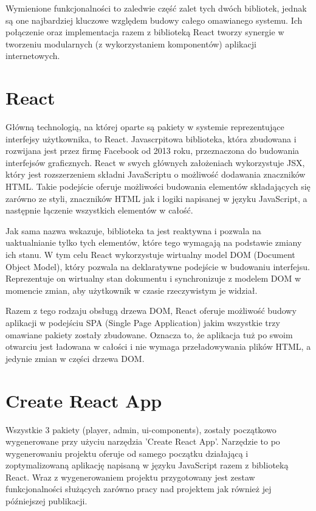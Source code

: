 Wymienione funkcjonalności to zaledwie część zalet tych dwóch bibliotek, jednak są one najbardziej kluczowe względem budowy całego omawianego systemu. Ich połączenie oraz implementacja razem z biblioteką React tworzy synergie w tworzeniu modularnych (z wykorzystaniem komponentów) aplikacji internetowych. 

\label{ch:frontend:react}
\section{React}
Główną technologią, na której oparte są pakiety w systemie reprezentujące interfejsy użytkownika, to React. Javascrpitowa biblioteka, która zbudowana i rozwijana jest przez firmę Facebook od 2013 roku, przeznaczona do budowania interfejsów graficznych. React w swych głównych założeniach wykorzystuje JSX, który jest rozszerzeniem składni JavaScriptu o możliwość dodawania znaczników HTML. Takie podejście oferuje możliwości budowania elementów składających się zarówno ze styli, znaczników HTML jak i logiki napisanej w języku JavaScript, a następnie łączenie wszystkich elementów w całość.

Jak sama nazwa wskazuje, biblioteka ta jest reaktywna i pozwala na uaktualnianie tylko tych elementów, które tego wymagają na podstawie zmiany ich stanu. W tym celu React wykorzystuje wirtualny model DOM (Document Object Model), który pozwala na deklaratywne podejście w budowaniu interfejsu. Reprezentuje on wirtualny stan dokumentu i synchronizuje z modelem DOM w momencie zmian, aby użytkownik w czasie rzeczywistym je widział.

Razem z tego rodzaju obsługą drzewa DOM, React oferuje możliwość budowy aplikacji w podejściu SPA (Single Page Application) jakim wszystkie trzy omawiane pakiety zostały zbudowane. Oznacza to, że aplikacja tuż po swoim otwarciu jest ładowana w całości i nie wymaga przeładowywania plików HTML, a jedynie zmian w części drzewa DOM.

\section{Create React App}
Wszystkie 3 pakiety (player, admin, ui-components), zostały początkowo wygenerowane przy użyciu narzędzia 'Create React App'. Narzędzie to po wygenerowaniu projektu oferuje od samego początku działającą i zoptymalizowaną aplikację napisaną w języku JavaScript razem z biblioteką React. Wraz z wygenerowaniem projektu przygotowany jest zestaw funkcjonalności służących zarówno pracy nad projektem jak również jej późniejszej publikacji.

